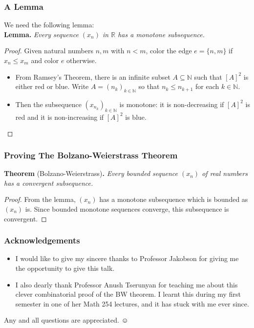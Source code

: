 \documentclass{beamer}
\begin{document}
\begin{frame}
\frametitle{A Lemma} We need the following lemma: \\

\textbf{Lemma.} \emph{Every sequence \( (x_{n}) \) in \( \mathbb{R} \) has a monotone subsequence.}
\begin{proof}
	Given natural numbers \( n , m  \) with \( n < m \), color the edge \( e = \{n , m \}  \) {\color{red}{red}} if \( x_{n} \leq x_{m}  \) and color \( e \) {\color{blue}{blue}} otherwise.
	\begin{itemize}
		\item From Ramsey's Theorem, there is an infinite subset \( A \subseteq \mathbb{N}  \) such that \( [A]^{2}  \) is either red or blue. Write \( A = (n_{k} )_{k \in \mathbb{N} }  \) so that \( n_k \leq n_{k+1} \) for each \( k \in \mathbb{N}  \).
		\item Then the subsequence \( (x_{n_{k} })_{k \in \mathbb{N}}  \) is monotone: it is non-decreasing if \( [A]^{2}  \) is red and it is non-increasing if \( [A]^{2}  \) is blue.

		
	\end{itemize}
\end{proof}
\end{frame}

\begin{frame}
	\frametitle{Proving The Bolzano-Weierstrass Theorem} \textbf{Theorem} (Bolzano-Weierstrass)\textbf{.} \emph{Every bounded sequence \( (x_{n}) \) of real numbers has a convergent subsequence.}
\begin{proof}
From the lemma, \( (x_{n}) \) has a monotone subsequence which is bounded as \( (x_{n}) \) is. Since bounded monotone sequences converge, this subsequence is convergent.
\end{proof}
\end{frame}

\begin{frame}
	\frametitle{Acknowledgements}

\begin{itemize}
	\item I would like to give my sincere thanks to Professor Jakobson for giving me the opportunity to give this talk.
	\item I also dearly thank Professor Anush Tserunyan for teaching me about this clever combinatorial proof of the BW theorem. I learnt this during my first semester in one of her Math 254 lectures, and it has stuck with me ever since.
\end{itemize}

\end{frame}

\begin{frame}
	\begin{center}
		{\Large {}} \newline \newline
		\large Any and all questions are appreciated. $\smiley$
	\end{center}
\end{frame}
\end{document}
